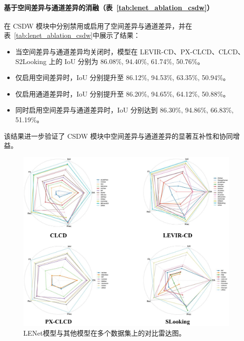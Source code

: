 \paragraph{基于空间差异与通道差异的消融（表~\ref{tab:lenet_ablation_csdw}）}
在 CSDW 模块中分别禁用或启用了空间差异与通道差异，并在表~\ref{tab:lenet_ablation_csdw}中展示了结果：  
\begin{itemize}
  \item 当空间差异与通道差异均关闭时，模型在 LEVIR-CD、PX-CLCD、CLCD、S2Looking 上的 IoU 分别为 86.08\%, 94.40\%, 61.74\%, 50.76\%。
  \item 仅启用空间差异时，IoU 分别提升至 86.12\%, 94.53\%, 63.35\%, 50.94\%。
  \item 仅启用通道差异时，IoU 分别提升至 86.20\%, 94.65\%, 64.12\%, 50.88\%。
  \item 同时启用空间差异与通道差异时，IoU 分别达到 86.30\%, 94.86\%, 66.83\%, 51.19\%。
\end{itemize}
该结果进一步验证了 CSDW 模块中空间差异与通道差异的显著互补性和协同增益。


\begin{figure}[!htbp]
  \centering
  \includegraphics[width=\textwidth]{paper_figures/基于双时相遥感影像特征交互的变化检测算法研究/LENet/lenet_rader.png}
  \caption{LENet模型与其他模型在多个数据集上的对比雷达图。}
  \label{fig:lenet_rader}
\end{figure}



